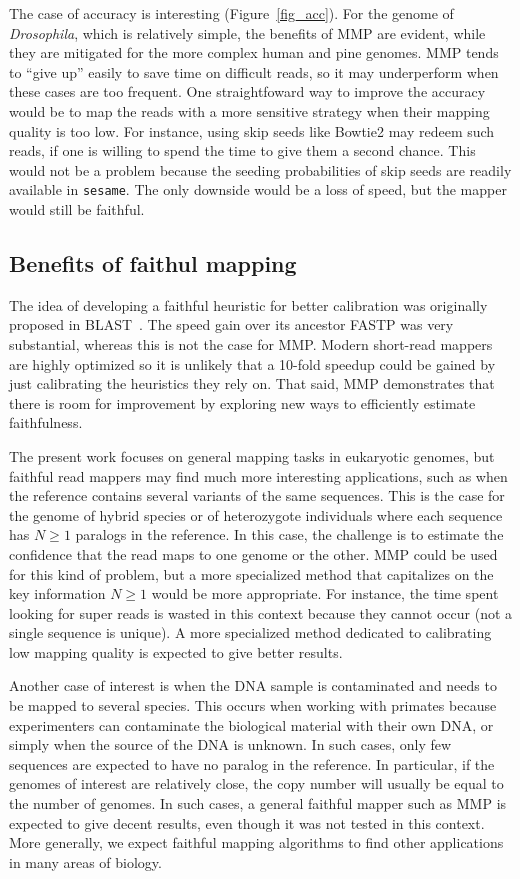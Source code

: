 \documentclass[english]{article}
\begin{document}
The case of accuracy is interesting (Figure~\ref{fig_acc}). For  the
genome of \textit{Drosophila}, which is relatively simple, the benefits of
MMP  are evident, while they are mitigated for the more complex human and
pine genomes. MMP tends to ``give up'' easily to save time on difficult
reads, so it may underperform when these cases are too frequent. One
straightfoward way to improve the accuracy would be to map the reads with
a more sensitive strategy when their mapping quality is too low. For
instance, using skip seeds like Bowtie2 may redeem such reads, if one is
willing to spend the time to give them a second chance. This would not be
a problem because the seeding probabilities of skip seeds are readily
available in \texttt{sesame}. The only downside would be a loss of speed,
but the mapper would still be faithful.


\subsection{Benefits of faithul mapping}

The idea of developing a faithful heuristic for better calibration was
originally proposed in BLAST~\cite{pmid2231712}. The speed gain over its
ancestor FASTP was very substantial, whereas this is not the case for MMP.
Modern short-read mappers are highly optimized so it is unlikely that a
10-fold speedup could be gained by just calibrating the heuristics they
rely on. That said, MMP demonstrates that there is room for improvement by
exploring new ways to efficiently estimate faithfulness.

The present work focuses on general mapping tasks in eukaryotic genomes,
but faithful read mappers may find much more interesting applications,
such as when the reference contains several variants of the same
sequences. This is the case for the genome of hybrid species or of
heterozygote individuals where each sequence has $N \geq 1$ paralogs in
the reference. In this case, the challenge is to estimate the confidence
that the read maps to one genome or the other. MMP could be used for this
kind of problem, but a more specialized method that capitalizes on the key
information $N \geq 1$ would be more appropriate. For instance, the time
spent looking for super reads is wasted in this context because they
cannot occur (not a single sequence is unique). A more specialized method
dedicated to calibrating low mapping quality is expected to give better
results.

Another case of interest is when the DNA sample is contaminated and needs
to be mapped to several species. This occurs when working with primates
because experimenters can contaminate the biological material with their
own DNA, or simply when the source of the DNA is unknown. In such cases,
only few sequences are expected to have no paralog in the reference. In
particular, if the genomes of interest are relatively close, the copy
number will usually be equal to the number of genomes. In such cases, a
general faithful mapper such as MMP is expected to give decent results,
even though it was not tested in this context. More generally, we expect
faithful mapping algorithms to find other applications in many areas of
biology. 
\end{document}
